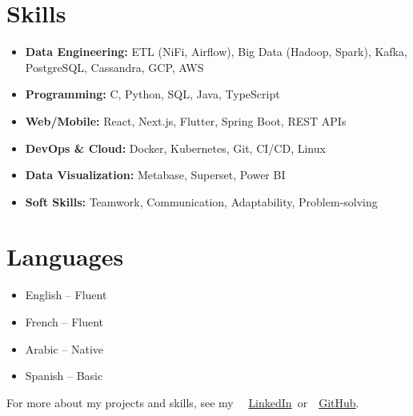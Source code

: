 \documentclass[10pt,a4paper,sans]{moderncv}
\begin{document}
\section{\fontsize{11}{12.1}\selectfont Skills}
\vspace{-6pt}
\begin{itemize}[leftmargin=0.3cm, itemsep=-2pt, topsep=0pt, partopsep=0pt, parsep=0pt]
    \item \textbf{Data Engineering:} ETL (NiFi, Airflow), Big Data (Hadoop, Spark), Kafka, PostgreSQL, Cassandra, GCP, AWS
    \item \textbf{Programming:} C, Python, SQL, Java, TypeScript
    \item \textbf{Web/Mobile:} React, Next.js, Flutter, Spring Boot, REST APIs
    \item \textbf{DevOps \& Cloud:} Docker, Kubernetes, Git, CI/CD, Linux
    \item \textbf{Data Visualization:} Metabase, Superset, Power BI
    \item \textbf{Soft Skills:} Teamwork, Communication, Adaptability, Problem-solving
\end{itemize}


\vspace{-17pt}
\section{\fontsize{11}{12.1}\selectfont Languages}
\vspace{-16pt}
\begin{multicols}{2}
\begin{itemize}[leftmargin=0.3cm, itemsep=0pt, topsep=0pt, partopsep=0pt, parsep=0pt]
    \item English – Fluent
    \item French – Fluent
    \item Arabic – Native
    \item Spanish – Basic
\end{itemize}
\end{multicols}



\vspace{-21pt}
\begin{center}
    {\fontsize{9}{11}\selectfont\color{gray}
    For more about my projects and skills, see my~
    \faLinkedin~\href{https://www.linkedin.com/in/ahmed-makroum/}{LinkedIn}~or~\faGithub~\href{https://github.com/ahmedmakroum}{GitHub}.}
\end{center}
\end{document}
